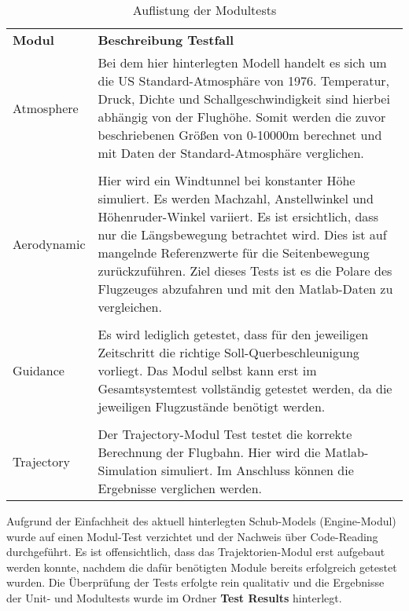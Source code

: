 \begin{table}[h]
\centering	\begin{tabular}{l p{12cm}}
		\textbf{Modul} & \textbf{Beschreibung Testfall}\\
		Atmosphere & Bei dem hier hinterlegten Modell  handelt es sich um die US Standard-Atmosphäre von 1976.  Temperatur, Druck, Dichte und Schallgeschwindigkeit sind hierbei abhängig von der Flughöhe. Somit werden die zuvor beschriebenen Größen von 0-10000m berechnet und mit Daten der Standard-Atmosphäre verglichen.\\\\
		Aerodynamic & Hier wird ein Windtunnel bei konstanter Höhe simuliert. Es werden Machzahl, Anstellwinkel und Höhenruder-Winkel variiert. Es ist ersichtlich, dass nur die Längsbewegung betrachtet wird. Dies ist auf mangelnde Referenzwerte für die Seitenbewegung zurückzuführen. Ziel dieses Tests ist es die Polare des Flugzeuges abzufahren und mit den Matlab-Daten zu vergleichen. \\\\
		Guidance &  Es wird lediglich getestet, dass für den jeweiligen Zeitschritt die richtige Soll-Querbeschleunigung vorliegt. Das Modul selbst kann erst im Gesamtsystemtest vollständig getestet werden, da die jeweiligen Flugzustände benötigt werden.\\\\
		Trajectory & Der Trajectory-Modul Test testet die korrekte Berechnung der Flugbahn. Hier wird die Matlab-Simulation simuliert. Im Anschluss können die Ergebnisse verglichen werden.
	\end{tabular}
\caption{Auflistung der Modultests}
\label{tab:modultests}
\end{table}
\newpage
Aufgrund der Einfachheit des aktuell hinterlegten Schub-Models (Engine-Modul) wurde auf einen Modul-Test verzichtet und der Nachweis über Code-Reading durchgeführt.
Es ist offensichtlich, dass das Trajektorien-Modul erst aufgebaut werden konnte, nachdem die dafür benötigten Module bereits erfolgreich getestet wurden. Die Überprüfung der Tests erfolgte rein qualitativ und die Ergebnisse der Unit- und Modultests wurde im Ordner \textbf{Test Results} hinterlegt.


